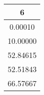 \begin{tabular}{c}
\hline \hline
       6 \\
\hline \hline
 0.00010 \\
10.00000 \\
52.84615 \\
52.51843 \\
66.57667 \\
\hline \hline
\end{tabular}
